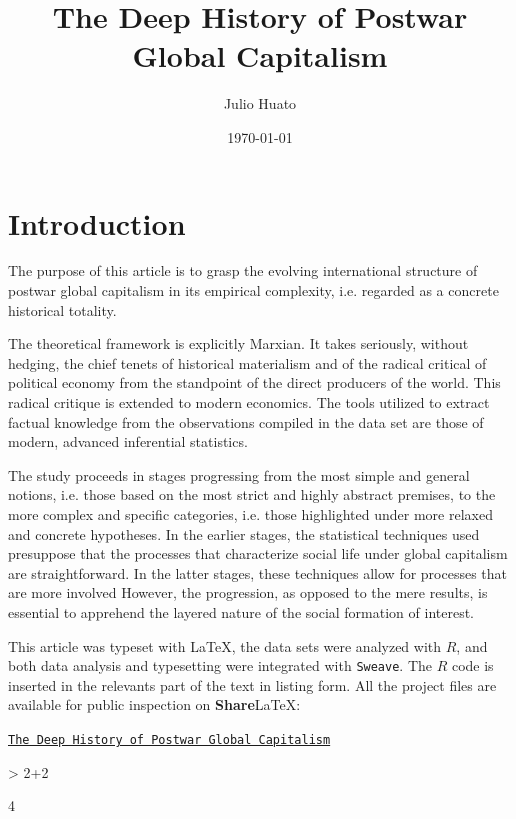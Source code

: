 \documentclass[pt=12]{article}
\title{The Deep History of Postwar Global Capitalism}
\author{Julio Huato}
\date{\today}
\begin{document}


\maketitle

\section{Introduction}

The purpose of this article is to grasp the evolving international structure of postwar global capitalism in its empirical complexity, i.e. regarded as a concrete historical totality.

The theoretical framework is explicitly Marxian.  It takes seriously, without hedging, the chief tenets of historical materialism and of the radical critical of political economy from the standpoint of the direct producers of the world.  This radical critique is extended to modern economics.  The tools utilized to extract factual knowledge from the observations compiled in the data set are those of modern, advanced inferential statistics.

The study proceeds in stages progressing from the most simple and general notions, i.e. those based on the most strict and highly abstract premises, to the more complex and specific categories, i.e. those highlighted under more relaxed and concrete hypotheses.  In the earlier stages, the statistical techniques used presuppose that the processes that characterize social life under global capitalism are straightforward.  In the latter stages, these techniques allow for processes that are more involved  However, the progression, as opposed to the mere results, is essential to apprehend the layered nature of the social formation of interest.

This article was typeset with \LaTeX, the data sets were analyzed with $R$, and both data analysis and typesetting were integrated with \texttt{Sweave}.  The $R$ code is inserted in the relevants part of the text in listing form. All the project files are available for public inspection on \textbf{Share}\LaTeX:

\href{https://www.sharelatex.com/project/5724dd4cc9e6d5e323d97763}{\texttt{The Deep History of Postwar Global Capitalism}}


\begin{Schunk}
\begin{Sinput}
> 2+2
\end{Sinput}
\begin{Soutput}
[1] 4
\end{Soutput}
\end{Schunk}
\end{document}
